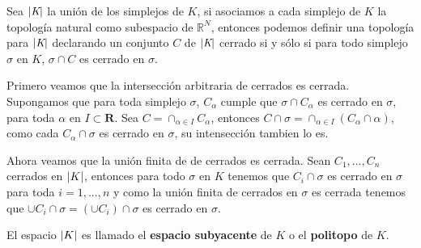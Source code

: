 \begin{Teo}
Sea $\left| \textit{K} \right|$ la unión de los simplejos de $\textit{K}$, si asociamos a cada simplejo de $\textit{K}$ la topología natural como subespacio de $\mathbb{R}^N$, entonces podemos definir una topología para $\left| \textit{K} \right|$ declarando  un conjunto $C$ de  $\left| \textit{K} \right|$ cerrado si y sólo si para todo simplejo $\sigma$ en  $\textit{K}$, $\sigma\cap C$ es cerrado en $\sigma$.
\end{Teo}
\begin{Dem}

Primero veamos que la intersección  arbitraria de cerrados es cerrada. Supongamos que para toda simplejo $\sigma$, $C_{\alpha}$ cumple que $\sigma\cap C_{\alpha}$ es cerrado en $\sigma$, para toda $\alpha$ en $I\subset \mathbf{R}$.
Sea $C = \cap_{\alpha \in I}C_{\alpha}$, entonces $C\cap\sigma = \cap_{\alpha\in I}(C_{\alpha}\cap\alpha)$, como cada $C_{\alpha}\cap \sigma$ es cerrado en $\sigma$, su intensección tambien lo es.

Ahora veamos que la unión finita de de cerrados es cerrada. Sean $C_1,...,C_n$ cerrados en $\left| K \right|$, entonces para todo $\sigma$ en $K$ tenemos que $C_i \cap \sigma$ es cerrado en $\sigma$ para toda $i =1,...,n$ y como la unión finita de cerrados en $\sigma$ es cerrada tenemos que $\cup C_i\cap\sigma = (\cup C_i)\cap\sigma$ es cerrado en $\sigma$.
\end{Dem}
El espacio $\left| K \right|$ es llamado el \textbf{espacio subyacente} de $K$ o el \textbf{politopo} de $K$.


